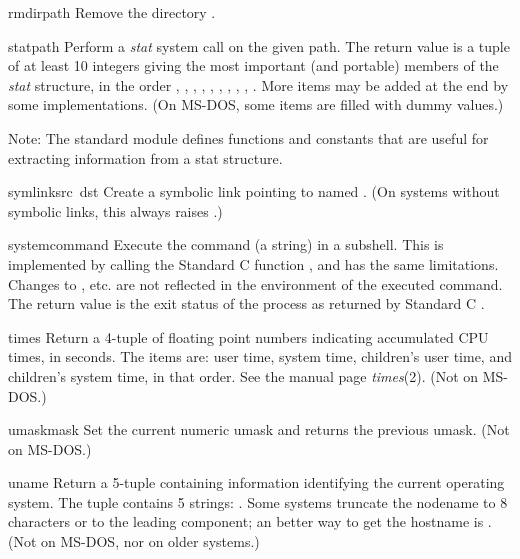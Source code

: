 \begin{funcdesc}{rmdir}{path}
Remove the directory .
\end{funcdesc}

\begin{funcdesc}{stat}{path}
Perform a {\em stat} system call on the given path.  The return value
is a tuple of at least 10 integers giving the most important (and
portable) members of the {\em stat} structure, in the order
,
,
,
,
,
,
,
,
,
.
More items may be added at the end by some implementations.
(On MS-DOS, some items are filled with dummy values.)

Note: The standard module  defines functions and constants
that are useful for extracting information from a stat structure.
\end{funcdesc}

\begin{funcdesc}{symlink}{src\, dst}
Create a symbolic link pointing to  named .  (On
systems without symbolic links, this always raises
.)
\end{funcdesc}

\begin{funcdesc}{system}{command}
Execute the command (a string) in a subshell.  This is implemented by
calling the Standard C function , and has the same
limitations.  Changes to ,  etc. are
not reflected in the environment of the executed command.  The return
value is the exit status of the process as returned by Standard C
.
\end{funcdesc}

\begin{funcdesc}{times}{}
Return a 4-tuple of floating point numbers indicating accumulated CPU
times, in seconds.  The items are: user time, system time, children's
user time, and children's system time, in that order.  See the \UNIX{}
manual page {\it times}(2).  (Not on MS-DOS.)
\end{funcdesc}

\begin{funcdesc}{umask}{mask}
Set the current numeric umask and returns the previous umask.
(Not on MS-DOS.)
\end{funcdesc}

\begin{funcdesc}{uname}{}
Return a 5-tuple containing information identifying the current
operating system.  The tuple contains 5 strings:
.
Some systems truncate the nodename to 8
characters or to the leading component; an better way to get the
hostname is .  (Not on MS-DOS, nor on older
\UNIX{} systems.)
\end{funcdesc}

